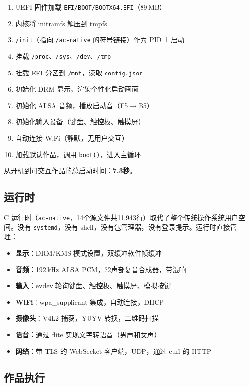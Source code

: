 \documentclass[10pt,letterpaper,twocolumn]{article}
\begin{document}
\begin{enumerate}
  \item UEFI 固件加载 \texttt{EFI/BOOT/BOOTX64.EFI}（89\,MB）
  \item 内核将 initramfs 解压到 tmpfs
  \item \texttt{/init}（指向 \texttt{/ac-native} 的符号链接）作为 PID~1 启动
  \item 挂载 \texttt{/proc}、\texttt{/sys}、\texttt{/dev}、\texttt{/tmp}
  \item 挂载 EFI 分区到 \texttt{/mnt}，读取 \texttt{config.json}
  \item 初始化 DRM 显示，渲染个性化启动画面
  \item 初始化 ALSA 音频，播放启动音（E5$\rightarrow$B5）
  \item 初始化输入设备（键盘、触控板、触摸屏）
  \item 自动连接 WiFi（静默，无用户交互）
  \item 加载默认作品，调用 \texttt{boot()}，进入主循环
\end{enumerate}

从开机到可交互作品的总启动时间：\textbf{7.3秒}。

\subsection{运行时}

C 运行时（\texttt{ac-native}，14个源文件共11,943行）取代了整个传统操作系统用户空间。没有 \texttt{systemd}，没有 shell，没有包管理器，没有登录提示。运行时直接管理：

\begin{itemize}
  \item \textbf{显示}：DRM/KMS 模式设置，双缓冲软件帧缓冲
  \item \textbf{音频}：192\,kHz ALSA PCM，32声部复音合成器，带混响
  \item \textbf{输入}：evdev 轮询键盘、触控板、触摸屏、模拟按键
  \item \textbf{WiFi}：wpa\_supplicant 集成，自动连接，DHCP
  \item \textbf{摄像头}：V4L2 捕获，YUYV 转换，二维码扫描
  \item \textbf{语音}：通过 flite 实现文字转语音（男声和女声）
  \item \textbf{网络}：带 TLS 的 WebSocket 客户端，UDP，通过 curl 的 HTTP
\end{itemize}

\subsection{作品执行}
\end{document}
